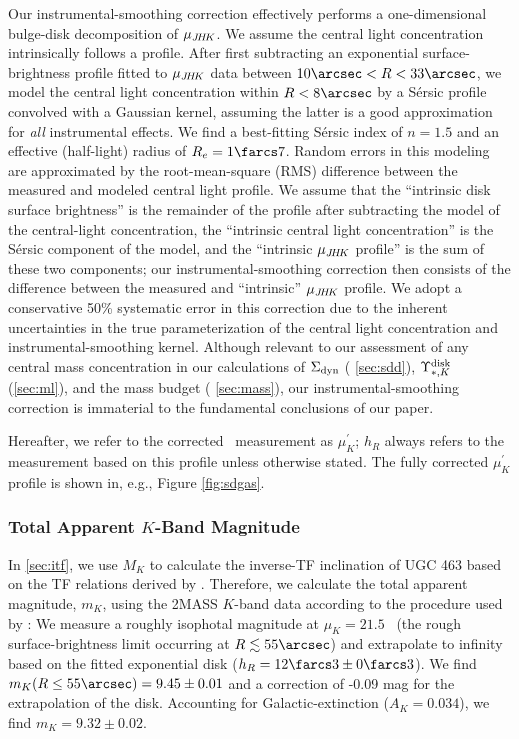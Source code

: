 \documentclass[apj,iop,numberedappendix]{emulateapj}
\begin{document}
Our instrumental-smoothing correction effectively performs a one-dimensional
bulge-disk decomposition of $\mu_{J\!H\!K}$.  We assume the central light concentration
intrinsically follows a \citet{1963BAAA....6...41S} profile.  After first
subtracting an exponential surface-brightness profile fitted to $\mu_{J\!H\!K}$ data
between $10\arcsec< R<33\arcsec$, we model the central light concentration
within $R<8\arcsec$ by a S{\'e}rsic profile convolved with a Gaussian kernel,
assuming the latter is a good approximation for {\it all} instrumental effects.
We find a best-fitting S{\'e}rsic index of $n=1.5$ and an effective (half-light)
radius of $R_e = 1\farcs7$.  Random errors in this modeling are approximated by
the root-mean-square (RMS) difference between the measured and modeled central
light profile.  We assume that the ``intrinsic disk surface brightness'' is the
remainder of the profile after subtracting the model of the central-light
concentration, the ``intrinsic central light concentration'' is the S{\'e}rsic
component of the model, and the ``intrinsic $\mu_{J\!H\!K}$ profile'' is the sum of
these two components; our instrumental-smoothing correction then consists of the
difference between the measured and ``intrinsic'' $\mu_{J\!H\!K}$ profile.  We adopt a
conservative 50\% systematic error in this correction due to the inherent
uncertainties in the true parameterization of the central light concentration
and instrumental-smoothing kernel.  Although relevant to our assessment of any
central mass concentration in our calculations of $\Sigma_{\rm dyn}$ (\sect
\ref{sec:sdd}), $\Upsilon_{\ast,K}^{\rm disk}$ (\sect \ref{sec:ml}), and the mass budget (\sect
\ref{sec:mass}), our instrumental-smoothing correction is immaterial to the
fundamental conclusions of our paper.

Hereafter, we refer to the corrected \jhk\ measurement as $\mu^{\prime}_K$;
$h_R$ always refers to the measurement based on this profile unless otherwise
stated.  The fully corrected $\mu^{\prime}_K$ profile is shown in, e.g., Figure
\ref{fig:sdgas}.

\subsubsection{Total Apparent $K$-Band Magnitude}
\label{sec:mk}

In \sect \ref{sec:itf}, we use $M_K$ to calculate the inverse-TF inclination of
UGC 463 based on the TF relations derived by .
Therefore, we calculate the total apparent magnitude, $m_K$, using the 2MASS
$K$-band data according to the procedure used by
:  We measure a roughly isophotal magnitude at
$\mu_K = 21.5$ \muu\ (the rough surface-brightness limit occurring at $R
\lesssim 55\arcsec$) and extrapolate to infinity based on the fitted exponential
disk ($h_R = 12\farcs3\pm0\farcs3$).  We find $m_K(R\leq55\arcsec) =
9.45\pm0.01$ and a correction of -0.09 mag for the extrapolation of the disk.
Accounting for Galactic-extinction ($A_K = 0.034$), we find $m_K = 9.32\pm0.02$.
\end{document}

